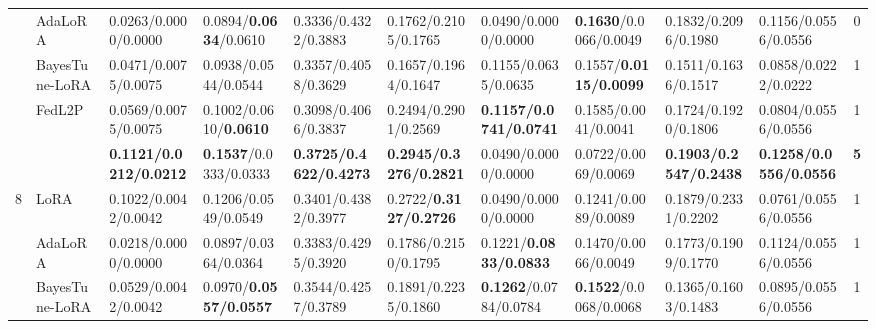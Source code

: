 \begin{table*}[t]
\begin{scriptsize}
{\begin{tabular}{c|l|l|l|l|l|l|l|l|l|c}
                    & AdaLoRA                              & 0.0263/0.0000/0.0000                   & 0.0894/\textbf{0.0634}/0.0610              & 0.3336/0.4322/0.3883             & 0.1762/0.2105/0.1765             & 0.0490/0.0000/0.0000                    & \textbf{0.1630}/0.0066/0.0049     & 0.1832/0.2096/0.1980              & 0.1156/0.0556/0.0556             & 0             \\ %
                    & BayesTune-LoRA                            & 0.0471/0.0075/0.0075             & 0.0938/0.0544/0.0544             & 0.3357/0.4058/0.3629             & 0.1657/0.1964/0.1647             & 0.1155/0.0635/0.0635             & 0.1557/\textbf{0.0115/0.0099}             & 0.1511/0.1636/0.1517             & 0.0858/0.0222/0.0222             & 1             \\ %
                    & FedL2P                               & 0.0569/0.0075/0.0075             & 0.1002/0.0610/\textbf{0.0610}               & 0.3098/0.4066/0.3837             & 0.2494/0.2901/0.2569             & \textbf{0.1157/0.0741/0.0741}    & 0.1585/0.0041/0.0041             & 0.1724/0.1920/0.1806              & 0.0804/0.0556/0.0556             & 1             \\ %
                    & \method{}                                 & \textbf{0.1121/0.0212/0.0212}    & \textbf{0.1537}/0.0333/0.0333    & \textbf{0.3725/0.4622/0.4273}    & \textbf{0.2945/0.3276/0.2821}    & 0.0490/0.0000/0.0000                    & 0.0722/0.0069/0.0069             & \textbf{0.1903/0.2547/0.2438}    & \textbf{0.1258/0.0556/0.0556}    & \textbf{5}    \\ \hline
\multirow{5}{*}{8}  & LoRA                                   & 0.1022/0.0042/0.0042             & 0.1206/0.0549/0.0549             & 0.3401/0.4382/0.3977             & 0.2722/\textbf{0.3127/0.2726}             & 0.0490/0.0000/0.0000                    & 0.1241/0.0089/0.0089             & 0.1879/0.2331/0.2202             & 0.0761/0.0556/0.0556             & 1             \\ %
                    & AdaLoRA                              & 0.0218/0.0000/0.0000                   & 0.0897/0.0364/0.0364             & 0.3383/0.4295/0.3920              & 0.1786/0.2150/0.1795              & 0.1221/\textbf{0.0833/0.0833}             & 0.1470/0.0066/0.0049              & 0.1773/0.1909/0.1770              & 0.1124/0.0556/0.0556             & 1             \\ %
                    & BayesTune-LoRA                            & 0.0529/0.0042/0.0042             & 0.0970/\textbf{0.0557/0.0557}              & 0.3544/0.4257/0.3789             & 0.1891/0.2235/0.1860              & \textbf{0.1262}/0.0784/0.0784    & \textbf{0.1522}/0.0068/0.0068    & 0.1365/0.1603/0.1483             & 0.0895/0.0556/0.0556             & 1             \\ %

\end{tabular}}
\end{scriptsize}
\end{table*}
